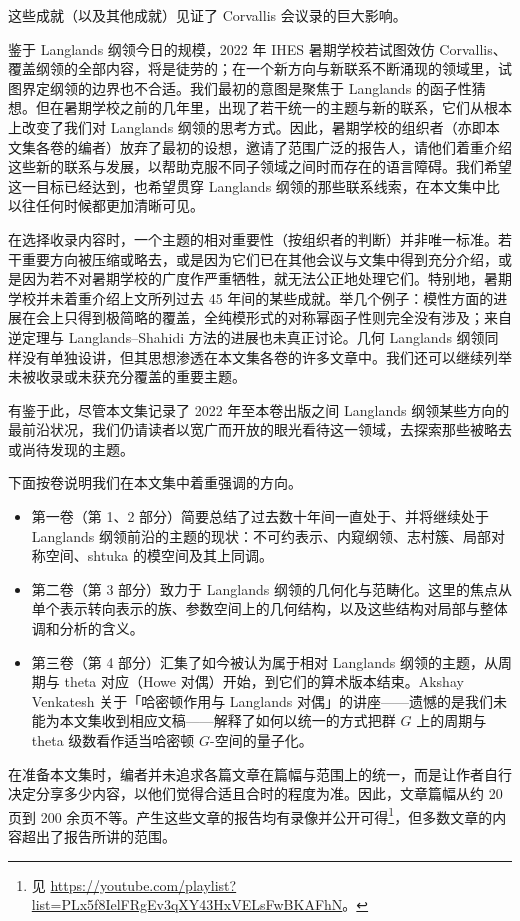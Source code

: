 这些成就（以及其他成就）见证了 Corvallis 会议录的巨大影响。

鉴于 Langlands 纲领今日的规模，2022 年 IHES 暑期学校若试图效仿 Corvallis、覆盖纲领的全部内容，将是徒劳的；在一个新方向与新联系不断涌现的领域里，试图界定纲领的边界也不合适。我们最初的意图是聚焦于 Langlands 的函子性猜想。但在暑期学校之前的几年里，出现了若干统一的主题与新的联系，它们从根本上改变了我们对 Langlands 纲领的思考方式。因此，暑期学校的组织者（亦即本文集各卷的编者）放弃了最初的设想，邀请了范围广泛的报告人，请他们着重介绍这些新的联系与发展，以帮助克服不同子领域之间时而存在的语言障碍。我们希望这一目标已经达到，也希望贯穿 Langlands 纲领的那些联系线索，在本文集中比以往任何时候都更加清晰可见。

在选择收录内容时，一个主题的相对重要性（按组织者的判断）并非唯一标准。若干重要方向被压缩或略去，或是因为它们已在其他会议与文集中得到充分介绍，或是因为若不对暑期学校的广度作严重牺牲，就无法公正地处理它们。特别地，暑期学校并未着重介绍上文所列过去 45 年间的某些成就。举几个例子：模性方面的进展在会上只得到极简略的覆盖，全纯模形式的对称幂函子性则完全没有涉及；来自逆定理与 Langlands–Shahidi 方法的进展也未真正讨论。几何 Langlands 纲领同样没有单独设讲，但其思想渗透在本文集各卷的许多文章中。我们还可以继续列举未被收录或未获充分覆盖的重要主题。

有鉴于此，尽管本文集记录了 2022 年至本卷出版之间 Langlands 纲领某些方向的最前沿状况，我们仍请读者以宽广而开放的眼光看待这一领域，去探索那些被略去或尚待发现的主题。

下面按卷说明我们在本文集中着重强调的方向。

\begin{itemize}[leftmargin=2em,itemsep=0.15em]
\item 第一卷（第 1、2 部分）简要总结了过去数十年间一直处于、并将继续处于 Langlands 纲领前沿的主题的现状：不可约表示、内窥纲领、志村簇、局部对称空间、shtuka 的模空间及其上同调。
\item 第二卷（第 3 部分）致力于 Langlands 纲领的几何化与范畴化。这里的焦点从单个表示转向表示的族、参数空间上的几何结构，以及这些结构对局部与整体调和分析的含义。
\item 第三卷（第 4 部分）汇集了如今被认为属于相对 Langlands 纲领的主题，从周期与 theta 对应（Howe 对偶）开始，到它们的算术版本结束。Akshay Venkatesh 关于「哈密顿作用与 Langlands 对偶」的讲座——遗憾的是我们未能为本文集收到相应文稿——解释了如何以统一的方式把群 $G$ 上的周期与 theta 级数看作适当哈密顿 $G$-空间的量子化。
\end{itemize}

在准备本文集时，编者并未追求各篇文章在篇幅与范围上的统一，而是让作者自行决定分享多少内容，以他们觉得合适且合时的程度为准。因此，文章篇幅从约 20 页到 200 余页不等。产生这些文章的报告均有录像并公开可得\footnote{见 \url{https://youtube.com/playlist?list=PLx5f8IelFRgEv3qXY43HxVELsFwBKAFhN}。}，但多数文章的内容超出了报告所讲的范围。

